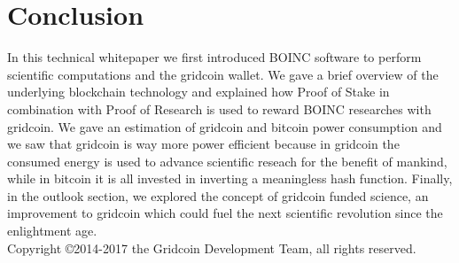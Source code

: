 \section{Conclusion}

In this technical whitepaper we first introduced BOINC software to perform scientific computations and the gridcoin wallet. We gave a brief overview of the underlying blockchain technology and explained how Proof of Stake in combination with Proof of Research is used to reward BOINC researches with gridcoin. We gave an estimation of gridcoin and bitcoin power consumption and we saw that gridcoin is way more power efficient because in gridcoin the consumed energy is used to advance scientific reseach for the benefit of mankind, while in bitcoin it is all invested in inverting a meaningless hash function. Finally, in the outlook section, we explored the concept of gridcoin funded science, an improvement to gridcoin which could fuel the next scientific revolution since the enlightment age.\\

Copyright \copyright  2014-2017 the Gridcoin Development Team, all rights reserved.
